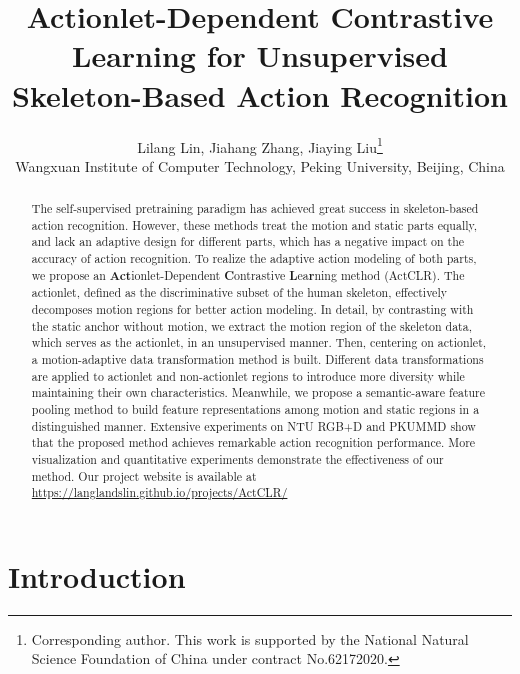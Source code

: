 \documentclass[twocolumn]{article}
\begin{document}
\title{Actionlet-Dependent Contrastive Learning for Unsupervised Skeleton-Based Action Recognition}

\author{Lilang Lin, Jiahang Zhang, Jiaying Liu\thanks{Corresponding author. This work is supported by the National Natural Science Foundation of China under contract No.62172020.}\\
Wangxuan Institute of Computer Technology, Peking University, Beijing, China\\
}
\maketitle



\begin{abstract}
The self-supervised pretraining paradigm has achieved great success in skeleton-based action recognition. However, these methods treat the motion and static parts equally, and lack an adaptive design for different parts, which has a negative impact on the accuracy of action recognition. To realize the adaptive action modeling of both parts, we propose an \textbf{Act}ionlet-Dependent \textbf{C}ontrastive \textbf{L}ea\textbf{r}ning method (ActCLR). The actionlet, defined as the discriminative subset of the human skeleton, effectively decomposes motion regions for better action modeling. In detail, by contrasting with the static anchor without motion, we extract the motion region of the skeleton data, which serves as the actionlet, in an unsupervised manner. Then, centering on actionlet, a motion-adaptive data transformation method is built. Different data transformations are applied to actionlet and non-actionlet regions to introduce more diversity while maintaining their own characteristics. Meanwhile, we propose a semantic-aware feature pooling method to build feature representations among motion and static regions in a distinguished manner. Extensive experiments on NTU RGB+D and PKUMMD show that the proposed method achieves remarkable action recognition performance. More visualization and quantitative experiments demonstrate the effectiveness of our method. Our project website is available at \url{https://langlandslin.github.io/projects/ActCLR/}

\end{abstract}

\section{Introduction}
\label{sec:intro}
\end{document}
